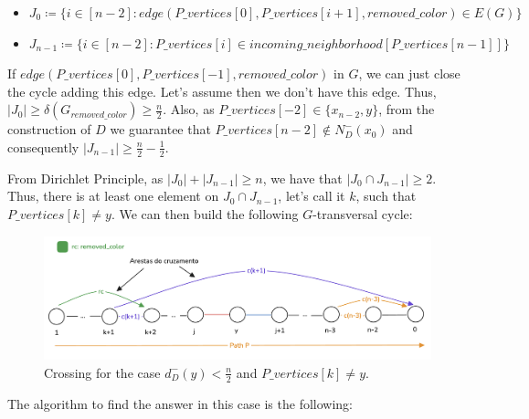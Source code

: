 \begin{itemize}
    \item $J_0 \coloneqq \{i \in [n-2]: edge(P\_vertices[0], P\_vertices[i + 1], removed\_color) \in E(G)\}$
    \item $J_{n-1} \coloneqq \{i \in [n-2]: P\_vertices[i] \in incoming\_neighborhood[P\_vertices[n - 1]]\}$
\end{itemize}


If $edge(P\_vertices[0], P\_vertices[-1], removed\_color)$ in $G$, we can just 
close the cycle adding this edge. Let's assume then we don't have this edge. 
Thus, $|J_0| \geq \delta(G_{removed\_color}) \geq \frac{n}{2}$. Also, as $P\_vertices[-2] \in \{x_{n-2}, y\}$, 
from the construction of $D$ we guarantee that $P\_vertices[n-2] \notin N^-_D(x_0)$
and consequently $|J_{n-1}| \geq \frac{n}{2} - \frac{1}{2}$.

From Dirichlet Principle, as $|J_0| + |J_{n-1}| \geq n$, we have that $|J_0 \cap J_{n-1}| \geq 2$. Thus,
there is at least one element on $J_0 \cap J_{n-1}$, let's call it $k$, such that $P\_vertices[k] \neq y$.
We can then build the following $G$-transversal cycle:

\begin{figure}[H]
    \centering
    \includegraphics[width=1\textwidth]{figuras/cycle_n-1_cruzamento_not_y.png}
    \caption{Crossing for the case $d^-_D(y) < \frac{n}{2}$ and $P\_vertices[k] \neq y$.}
    \label{fig:cycle_n-1_cruzamento_not_y}
\end{figure}

The algorithm to find the answer in this case is the following:

